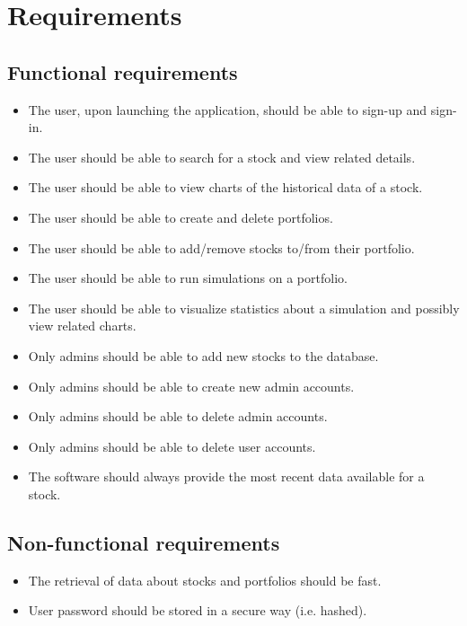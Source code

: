 \section{Requirements}

\subsection{Functional requirements}
\begin{itemize}
	\item The user, upon launching the application, should be able to sign-up and sign-in.
	\item The user should be able to search for a stock and view related details.
	\item The user should be able to view charts of the historical data of a stock.
	\item The user should be able to create and delete portfolios.
	\item The user should be able to add/remove stocks to/from their portfolio.
	\item The user should be able to run simulations on a portfolio.
	\item The user should be able to visualize statistics about a simulation and possibly view related charts.
	\item Only admins should be able to add new stocks to the database.
	\item Only admins should be able to create new admin accounts.
	\item Only admins should be able to delete admin accounts.
	\item Only admins should be able to delete user accounts.
	\item The software should always provide the most recent data available for a stock.
\end{itemize}

\subsection{Non-functional requirements}
\begin{itemize}
	\item The retrieval of data about stocks and portfolios should be fast.
	\item User password should be stored in a secure way (i.e. hashed).
\end{itemize}
